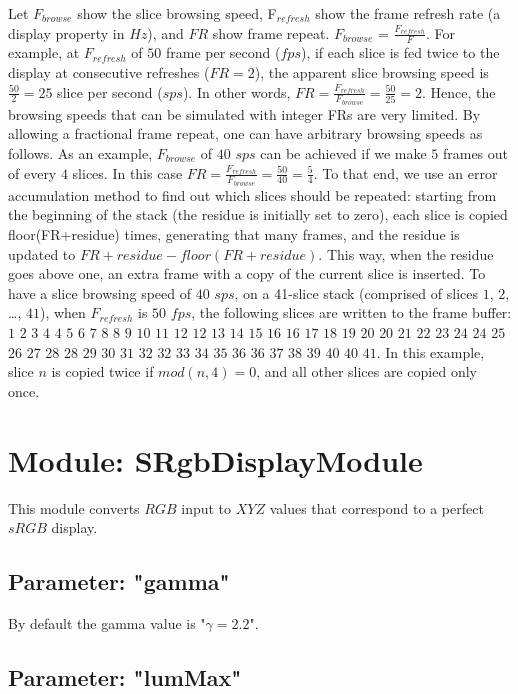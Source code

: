 Let $F_{browse}$ show the slice browsing speed, F$_{refresh}$ show the frame refresh rate (a display property in $Hz$), and $FR$ show frame repeat. $F_{browse}$ = $\frac{F_{refresh}}{F}$. For example, at $F_{refresh}$ of $50$ frame per second ($fps$), if each slice is fed twice to the display at consecutive refreshes ($FR = 2$), the apparent slice browsing speed is $\frac{50}{2} = 25$ slice per second ($sps$). In other words, $FR = \frac{F_{refresh}}{F_{browse}} = \frac{50}{25} = 2$. Hence, the browsing speeds that can be simulated with integer FRs are very limited. By allowing a fractional frame repeat, one can have arbitrary browsing speeds as follows. As an example, $F_{browse}$ of $40$ $sps$ can be achieved if we make $5$ frames out of every $4$ slices. In this case $FR = \frac{F_{refresh}}{F_{browse}} = \frac{50}{40} = \frac{5}{4}$. To that end, we use an error accumulation method to find out which slices should be repeated: starting from the beginning of the stack (the residue is initially set to zero), each slice is copied floor(FR+residue) times, generating that many frames, and the residue is updated to $FR+residue-floor(FR+residue)$. This way, when the residue goes above one, an extra frame with a copy of the current slice is inserted. To have a slice browsing speed of $40$ $sps$, on a 41-slice stack (comprised of slices $1$, $2$, \ldots{}, $41$), when $F_{refresh}$ is $50$ $fps$, the following slices are written to the frame buffer: $1$ $2$ $3$ $4$ $4$ $5$ $6$ $7$ $8$ $8$ $9$ $10$ $11$ $12$ $12$ $13$ $14$ $15$ $16$ $16$ $17$ $18$ $19$ $20$ $20$ $21$ $22$ $23$ $24$ $24$ $25$ $26$ $27$ $28$ $28$ $29$ $30$ $31$ $32$ $32$ $33$ $34$ $35$ $36$ $36$ $37$ $38$ $39$ $40$ $40$ $41$. In this example, slice $n$ is copied twice if $mod(n, 4) = 0$, and all other slices are copied only once.

\section{Module: SRgbDisplayModule}

This module converts $RGB$ input to $XYZ$ values that correspond to a perfect $sRGB$ display.

\subsection{Parameter: "gamma"}

By default the gamma value is "$\gamma=2.2$". 

\subsection{Parameter: "lumMax"}

